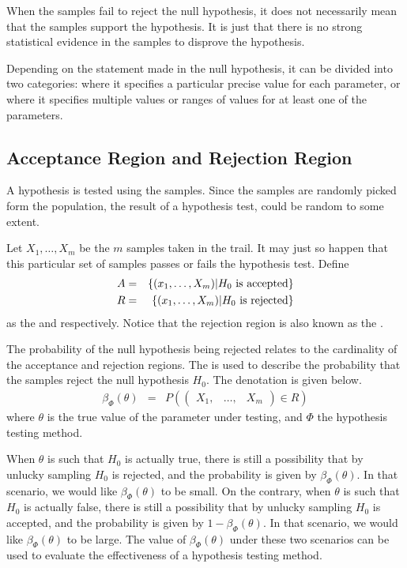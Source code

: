 When the samples fail to reject the null hypothesis, it does not necessarily mean that the samples support the hypothesis. It is just that there is no strong statistical evidence in the samples to disprove the hypothesis.

Depending on the statement made in the null hypothesis, it can be divided into two categories:  where it specifies a particular precise value for each parameter, or  where it specifies multiple values or ranges of values for at least one of the parameters. 

\subsection{Acceptance Region and Rejection Region}

A hypothesis is tested using the samples. Since the samples are randomly picked form the population, the result of a hypothesis test, could be random to some extent.

Let $X_1, \ldots, X_m$ be the $m$ samples taken in the trail. It may just so happen that this particular set of samples passes or fails the hypothesis test. Define
\begin{eqnarray}
	A &=& \left\{\left(x_1, \ldots, X_m\right)\middle| H_0 \textup{~is accepted}\right\} \label{eq:htest_a} \\
	R &=& \left\{\left(x_1, \ldots, X_m\right)\middle| H_0 \textup{~is rejected}\right\} \label{eq:htest_r}
\end{eqnarray}
as the  and  respectively. Notice that the rejection region is also known as the . 

The probability of the null hypothesis being rejected relates to the cardinality of the acceptance and rejection regions. The  is used to describe the probability that the samples reject the null hypothesis $H_0$. The denotation is given below.
\begin{eqnarray}
	\beta_\Phi(\theta) &=& P\left(\left(\begin{array}{ccc}
		X_1, & \ldots, & X_m
	\end{array}\right)\in R\right) \nonumber
\end{eqnarray}
where $\theta$ is the true value of the parameter under testing, and $\Phi$ the hypothesis testing method.

When $\theta$ is such that $H_0$ is actually true, there is still a possibility that by unlucky sampling $H_0$ is rejected, and the probability is given by $\beta_\Phi(\theta)$. In that scenario, we would like $\beta_\Phi(\theta)$ to be small. On the contrary, when $\theta$ is such that $H_0$ is actually false, there is still a possibility that by unlucky sampling $H_0$ is accepted, and the probability is given by $1-\beta_\Phi(\theta)$. In that scenario, we would like $\beta_\Phi(\theta)$ to be large. The value of $\beta_\Phi(\theta)$ under these two scenarios can be used to evaluate the effectiveness of a hypothesis testing method.

